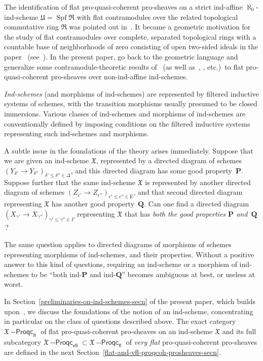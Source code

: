\documentclass[12pt,a4paper]{amsart}
\newcommand{\+}{\protect\nobreakdash-}
\renewcommand{\:}{\colon}
\DeclareMathOperator{\Spf}{Spf}
\newcommand{\Proqc}{{\operatorname{\mathsf{--Proqc}}}}
\newcommand{\fl}{\mathsf{fl}}
\newcommand{\vfl}{\mathsf{vfl}}
\newcommand{\rE}{\mathrm E}
\newcommand{\bP}{\mathbf P}
\newcommand{\bQ}{\mathbf Q}
\newcommand{\fX}{\mathfrak X}
\newcommand{\fR}{\mathfrak R}
\newcommand{\fU}{\mathfrak U}
\theoremstyle{plain}
\theoremstyle{definition}
\begin{document}
 The identification of flat pro-quasi-coherent pro-sheaves on
a strict ind-affine $\aleph_0$\+ind-scheme $\fU=\Spf\fR$ with flat
contramodules over the related topological commutative ring $\fR$ was
pointed out in~\cite[Example~3.8(2)]{Psemten}.
 It became a geometric motivation for the study of flat contramodules
over complete, separated topological rings with a countable base of
neighborhoods of zero consisting of open two-sided ideals in
the paper~\cite[Sections~7--13]{Pflcc} (see~\cite[Example~8.9]{Pflcc}).
 In the present paper, go back to the geometric language and
generalize some contramodule-theoretic results of~\cite{Pflcc}
(as well as~\cite[Appendix~E]{Pcosh}, \cite{PR}, etc.)\ to flat
pro-quasi-coherent pro-sheaves over non-ind-affine ind-schemes.

 \emph{Ind-schemes} (and morphisms of ind-schemes) are represented
by filtered inductive systems of schemes, with the transition
morphisms usually presumed to be closed immersions.
 Various classes of ind-schemes and morphisms of ind-schemes are
conventionally defined by imposing conditions on the filtered
inductive systems representing such ind-schemes and morphisms.

 A subtle issue in the foundations of the theory arises immediately.
 Suppose that we are given an ind-scheme $\fX$, represented by
a directed diagram of schemes
$(Y_{\delta'}\to Y_{\delta''})_{\delta'\le\delta''\in\Delta}$,
and this directed diagram has some good property~$\bP$.
 Suppose further that the same ind-scheme $\fX$ is represented by
another directed diagram of schemes
$(Z_{\epsilon'}\to Z_{\epsilon''})_{\epsilon'\le\epsilon''\in\rE}$,
and that second directed diagram representing $\fX$ has another good
property~$\bQ$.
 Can one find a directed diagram
$(X_{\gamma'}\to X_{\gamma''})_{\gamma'\le\gamma''\in\Gamma}$
representing $\fX$ that has \emph{both the good properties\/ $\bP$
and\/~$\bQ$}\,?

 The same question applies to directed diagrams of morphisms of
schemes representing morphisms of ind-schemes, and their properties.
 Without a positive answer to this kind of questions, requiring
an ind-scheme or a morphism of ind-schemes to be ``both ind\+$\bP$ and
ind\+$\bQ$'' becomes ambiguous at best, or useless at worst.

 In Section~\ref{preliminaries-on-ind-schemes-secn} of the present
paper, which builds upon~\cite[Chapter~1]{Psemten}, we discuss
the foundations of the notion of an ind-scheme, concentrating in
particular on the class of questions described above.
 The exact category $\fX\Proqc_\fl$ of flat pro-quasi-coherent
pro-sheaves on an ind-scheme $\fX$ and its full subcategory
$\fX\Proqc_\vfl\subset\fX\Proqc_\fl$ of \emph{very flat}
pro-quasi-coherent pro-sheaves are defined in the next
Section~\ref{flat-and-vfl-proqcoh-prosheaves-secn}.
\end{document}
